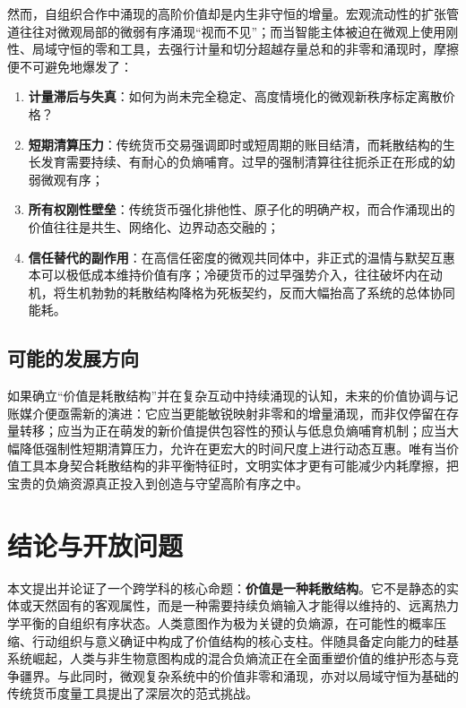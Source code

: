 \documentclass[11pt,a4paper]{ctexart}
\begin{document}
然而，自组织合作中涌现的高阶价值却是内生非守恒的增量。宏观流动性的扩张管道往往对微观局部的微弱有序涌现“视而不见”；而当智能主体被迫在微观上使用刚性、局域守恒的零和工具，去强行计量和切分超越存量总和的非零和涌现时，摩擦便不可避免地爆发了：
\begin{enumerate}
    \item \textbf{计量滞后与失真}：如何为尚未完全稳定、高度情境化的微观新秩序标定离散价格？
    \item \textbf{短期清算压力}：传统货币交易强调即时或短周期的账目结清，而耗散结构的生长发育需要持续、有耐心的负熵哺育。过早的强制清算往往扼杀正在形成的幼弱微观有序；
    \item \textbf{所有权刚性壁垒}：传统货币强化排他性、原子化的明确产权，而合作涌现出的价值往往是共生、网络化、边界动态交融的；
    \item \textbf{信任替代的副作用}：在高信任密度的微观共同体中，非正式的温情与默契互惠本可以极低成本维持价值有序；冷硬货币的过早强势介入，往往破坏内在动机，将生机勃勃的耗散结构降格为死板契约，反而大幅抬高了系统的总体协同能耗。
\end{enumerate}

\subsection{可能的发展方向}
如果确立“价值是耗散结构”并在复杂互动中持续涌现的认知，未来的价值协调与记账媒介便亟需新的演进：它应当更能敏锐映射非零和的增量涌现，而非仅停留在存量转移；应当为正在萌发的新价值提供包容性的预认与低息负熵哺育机制；应当大幅降低强制性短期清算压力，允许在更宏大的时间尺度上进行动态互惠。唯有当价值工具本身契合耗散结构的非平衡特征时，文明实体才更有可能减少内耗摩擦，把宝贵的负熵资源真正投入到创造与守望高阶有序之中。

\section{结论与开放问题}

本文提出并论证了一个跨学科的核心命题：\textbf{价值是一种耗散结构}。它不是静态的实体或天然固有的客观属性，而是一种需要持续负熵输入才能得以维持的、远离热力学平衡的自组织有序状态。人类意图作为极为关键的负熵源，在可能性的概率压缩、行动组织与意义确证中构成了价值结构的核心支柱。伴随具备定向能力的硅基系统崛起，人类与非生物意图构成的混合负熵流正在全面重塑价值的维护形态与竞争疆界。与此同时，微观复杂系统中的价值非零和涌现，亦对以局域守恒为基础的传统货币度量工具提出了深层次的范式挑战。
\end{document}
